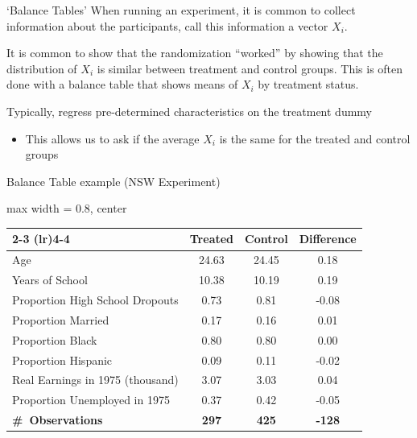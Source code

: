 \documentclass[aspectratio=169,t,11pt,table]{beamer}
\begin{document}
\begin{frame}{`Balance Tables'}
  When running an experiment, it is common to collect information about the participants, call this information a vector $X_i$.

  \bigskip
  It is common to show that the randomization ``worked'' by showing that the distribution of $X_i$ is similar between treatment and control groups. This is often done with a \alert{balance table} that shows means of $X_i$ by treatment status.

  \bigskip
  Typically, regress pre-determined characteristics on the treatment dummy
  \begin{itemize}
    \item This allows us to ask if the average $X_i$ is the same for the treated and control groups
  \end{itemize}
\end{frame}

\begin{frame}{Balance Table example (NSW Experiment)}
  \begin{adjustbox}{max width = 0.8\textwidth, center}
    \begin{tabular}{lcc@{\hspace{1.5em}}c}
    \toprule
    \cmidrule(lr){2-3} \cmidrule(lr){4-4} 
    & Treated & Control & Difference \\
    
    \midrule
    Age & 24.63 & 24.45 & 0.18 \\
    Years of School & 10.38 & 10.19 & 0.19 \\
    Proportion High School Dropouts & 0.73 & 0.81 & -0.08 \\
    Proportion Married & 0.17 & 0.16 & 0.01 \\
    Proportion Black & 0.80 & 0.80 & 0.00 \\
    Proportion Hispanic & 0.09 & 0.11 & -0.02 \\
    Real Earnings in 1975 (thousand) & 3.07 & 3.03 & 0.04 \\
    Proportion Unemployed in 1975 & 0.37 & 0.42 & -0.05 \\
    \midrule

    \textbf{\#\ Observations} & \textbf{297} & \textbf{425} & \textbf{-128} \\
    \bottomrule
    \end{tabular}
  \end{adjustbox}
\end{frame}
\end{document}
